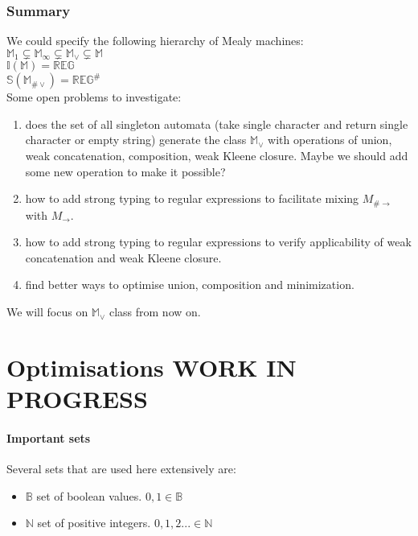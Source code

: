 \documentclass[12pt]{article}
\begin{document}
\section{Summary} We could specify the following hierarchy of Mealy machines: \\
$\mathbb{M}_1 \subsetneq \mathbb{M}_\infty \subsetneq \mathbb{M}_\vee \subsetneq \mathbb{M}$ \\
$\mathbb{I}(\mathbb{M}) = \mathbb{REG}$ \\
$\mathbb{S}(\mathbb{M}_{\#\vee}) = \mathbb{REG}^\#$ \\
Some open problems to investigate: 
\begin{enumerate}
	\item does the set of all singleton automata  (take single character and return single character or empty string) generate the class $\mathbb{ M}_\vee$ with operations of union, weak concatenation, composition, weak Kleene closure. Maybe  we should add some new operation to make it possible?
	\item how to add strong typing to regular expressions to facilitate mixing $M_{\#\rightarrow}$ with $M_{\rightarrow}$.
	\item how to add strong typing to regular expressions to verify applicability of weak concatenation and weak Kleene closure.
	\item find better ways to optimise union, composition and minimization.
\end{enumerate}
We will focus on $\mathbb{M}_\vee$ class from now on.
\part{Optimisations WORK IN PROGRESS}
\subsection{Important sets}
Several sets that are used here extensively are:
\begin{itemize}
	\item $\mathbb{ B}$ set of boolean values. $0,1 \in\mathbb{ B}$ 
	\item $\mathbb{ N}$ set of positive integers. $0,1,2... \in\mathbb{ N}$ 
\end{itemize}
\end{document}
